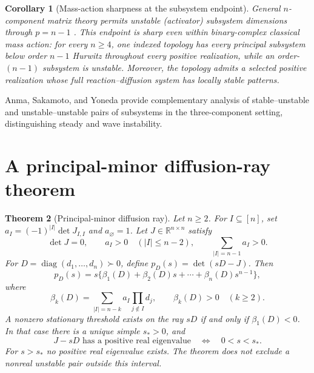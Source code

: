 \documentclass[11pt]{article}
\newtheorem{theorem}{Theorem}[section]
\newtheorem{corollary}[theorem]{Corollary}
\theoremstyle{definition}
\newcommand{\R}{\mathbb R}
\newcommand{\diag}{\operatorname{diag}}
\newcommand{\1}{\mathbf 1}
\begin{document}
\begin{corollary}[Mass-action sharpness at the subsystem endpoint]\label{cor:endpoint}
General $n$-component matrix theory permits unstable (activator) subsystem
dimensions through $p=n-1$ \cite{Satnoianu2000}.  This endpoint is sharp even
within binary-complex classical mass action: for every $n\ge4$, one indexed
topology has every principal subsystem below order $n-1$ Hurwitz throughout
every positive realization, while an order-$(n-1)$ subsystem is unstable.
Moreover, the topology admits a selected positive realization whose full
reaction--diffusion system has locally stable patterns.
\end{corollary}
Anma, Sakamoto, and Yoneda \cite{Anma2012} provide complementary analysis of
stable--unstable and unstable--unstable pairs of subsystems in the
three-component setting, distinguishing steady and wave instability.

\section{A principal-minor diffusion-ray theorem}

\begin{theorem}[Principal-minor diffusion ray]\label{thm:diffusionray}
Let $n\ge2$.  For $I\subseteq[n]$, set
$a_I=(-1)^{|I|}\det J_{I,I}$ and
$a_\varnothing=1$.  Let $J\in\R^{n\times n}$ satisfy
\begin{equation}\label{eq:pmhyp}
 \det J=0,\qquad a_I>0\quad(|I|\le n-2),\qquad
 \sum_{|I|=n-1}a_I>0.
\end{equation}
For $D=\diag(d_1,\ldots,d_n)\succ0$, define $p_D(s)=\det(sD-J)$.  Then
\begin{equation}\label{eq:pdbeta}
 p_D(s)=s\{\beta_1(D)+\beta_2(D)s+\cdots+\beta_n(D)s^{n-1}\},
\end{equation}
where
\begin{equation}\label{eq:betak}
 \beta_k(D)=\sum_{|I|=n-k}a_I\prod_{j\notin I}d_j,
 \qquad \beta_k(D)>0\quad(k\ge2).
\end{equation}
A nonzero stationary threshold exists on the ray $sD$ if and only if
$\beta_1(D)<0$.  In that case there is a unique simple $s_*>0$, and
\begin{equation}\label{eq:exactband}
 J-sD\text{ has a positive real eigenvalue}
 \quad\Longleftrightarrow\quad 0<s<s_*.
\end{equation}
For $s>s_*$ no positive real eigenvalue exists.  The theorem does not exclude
a nonreal unstable pair outside this interval.
\end{theorem}
\end{document}
